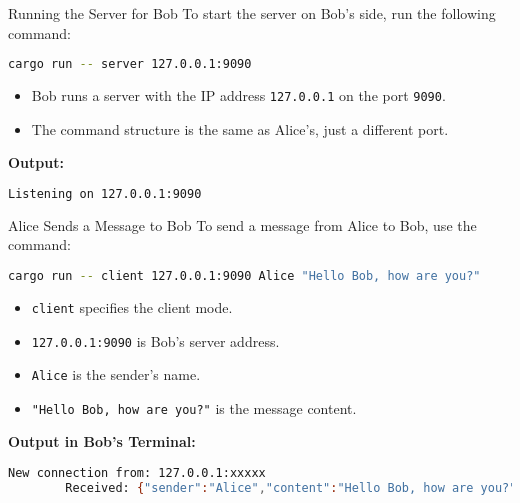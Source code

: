 \documentclass[aspectratio=169, table]{beamer}
\begin{document}
\begin{frame}[fragile]{Running the Server for Bob}
	\vspace{10pt}
	To start the server on Bob's side, run the following command:
	\begin{lstlisting}[language=bash]
		cargo run -- server 127.0.0.1:9090
	\end{lstlisting}
	
	\begin{itemize}
		\item Bob runs a server with the IP address \texttt{127.0.0.1} on the port \texttt{9090}.
		\item The command structure is the same as Alice's, just a different port.
	\end{itemize}
	
	\textbf{Output:}
	\begin{lstlisting}[language=bash]
		Listening on 127.0.0.1:9090
	\end{lstlisting}
	
\end{frame}

\begin{frame}[fragile]{Alice Sends a Message to Bob}
	\vspace{10pt}
	To send a message from Alice to Bob, use the command:
	\begin{lstlisting}[language=bash]
		cargo run -- client 127.0.0.1:9090 Alice "Hello Bob, how are you?"
	\end{lstlisting}
	
	\begin{itemize}
		\item \texttt{client} specifies the client mode.
		\item \texttt{127.0.0.1:9090} is Bob's server address.
		\item \texttt{Alice} is the sender's name.
		\item \texttt{"Hello Bob, how are you?"} is the message content.
	\end{itemize}
	
	\textbf{Output in Bob's Terminal:}
	\begin{lstlisting}[language=bash]
		New connection from: 127.0.0.1:xxxxx
		Received: {"sender":"Alice","content":"Hello Bob, how are you?"}
	\end{lstlisting}
\end{frame}
\end{document}
